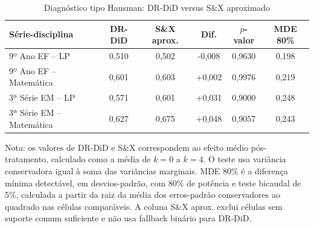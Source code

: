 \begin{table}[htbp]
\centering
\caption{Diagnóstico tipo Hausman: DR-DiD versus S\&X aproximado}
\label{tab:hausman_composicao}
\small
\begin{tabular}{lccccc}
\toprule
Série-disciplina & DR-DiD & S\&X aprox. & Dif. & \(p\)-valor & MDE 80\% \\
\midrule
9º Ano EF -- LP & 0,510 & 0,502 & -0,008 & 0,9630 & 0,198 \\
9º Ano EF -- Matemática & 0,601 & 0,603 & +0,002 & 0,9976 & 0,219 \\
3ª Série EM -- LP & 0,571 & 0,601 & +0,031 & 0,9000 & 0,248 \\
3ª Série EM -- Matemática & 0,627 & 0,675 & +0,048 & 0,9057 & 0,243 \\
\bottomrule
\end{tabular}
\vspace{0.2cm}
\begin{flushleft}
\footnotesize Nota: os valores de DR-DiD e S\&X correspondem ao efeito médio pós-tratamento, calculado como a média de \(k=0\) a \(k=4\). O teste usa variância conservadora igual à soma das variâncias marginais. MDE 80\% é a diferença mínima detectável, em desvios-padrão, com 80\% de potência e teste bicaudal de 5\%, calculada a partir da raiz da média dos erros-padrão conservadores ao quadrado nas células comparáveis. A coluna S\&X aprox. exclui células sem suporte comum suficiente e não usa fallback binário para DR-DiD.
\end{flushleft}
\end{table}
